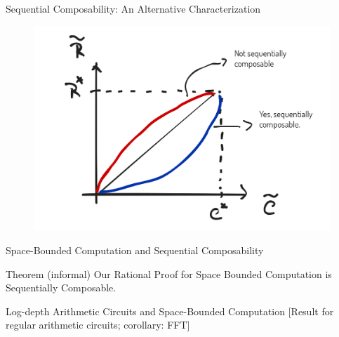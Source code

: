 \begin{frame}{Sequential Composability: An Alternative Characterization}
\begin{figure}
	\includegraphics[scale=0.27]{pics/sc-char.png}
\end{figure}
\end{frame}

\begin{frame}{Space-Bounded Computation and Sequential Composability}
\begin{block}{Theorem (informal)}
	Our Rational Proof for Space Bounded Computation is Sequentially Composable.
\end{block}
\end{frame}

\begin{frame}{Log-depth Arithmetic Circuits and Space-Bounded Computation}
[Result for regular arithmetic circuits; corollary: FFT]
\end{frame}

